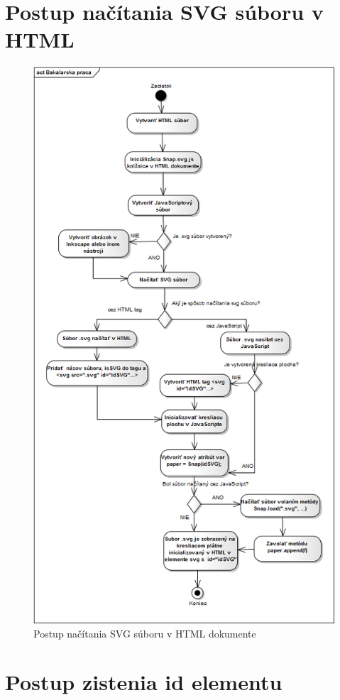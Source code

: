 	\section{Postup načítania SVG súboru v HTML}
\begin{figure}[H]
	\centering
	\includegraphics[width=0.6\linewidth]{uml/aktivityInicializacie}
	\caption{Postup načítania SVG súboru v HTML dokumente}
	\label{fig:aktivity1}
\end{figure}

\section{Postup zistenia id elementu}

